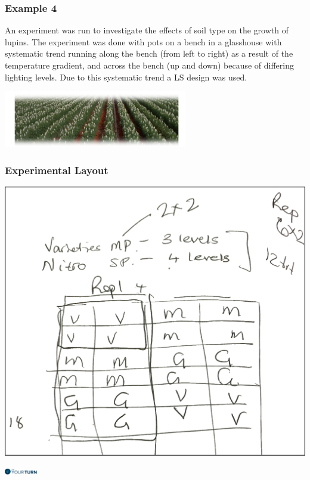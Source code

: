 \begin{frame}\frametitle{Example 4}

An experiment was run to investigate the effects of soil type on the growth of lupins. The experiment was done with
pots on a bench in a glasshouse with systematic trend running along the bench (from left to right) as a result of the
temperature gradient, and across the bench (up and down) because of differing lighting levels. Due to this systematic
trend a LS design was used.

\vspace{1cm}

\centering
\includegraphics[width = 8cm]{lupin}
\end{frame}

\begin{frame}\frametitle{Experimental Layout}

\begin{center}
\includegraphics[height = 0.7\textheight]{exptlayout.png}
\end{center}
\flushright
\includegraphics[height = 0.3cm]{yourturn}
\end{frame}


